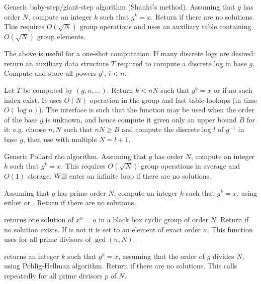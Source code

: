  \break
Generic baby-step/giant-step algorithm (Shanks's method). Assuming
that $g$ has order $N$, compute an integer $k$ such that $g^k = x$.
Return  if there are no solutions. This requires
$O(\sqrt{N})$ group operations and uses an auxiliary table containing
$O(\sqrt{N})$ group elements.

The above is useful for a one-shot computation. If many discrete logs
are desired:
return an auxiliary data structure $T$ required to compute a discrete log in
base $g$. Compute and store all powers $g^i$,  $i < n$.

Let $T$ be computed by $(g,n,\dots)$.
Return $k < n N$ such that  $g^k = x$ or  if no such index exist.
It uses $O(N)$ operation in the group and fast table lookups  (in time
$O(\log n)$). The interface is such that the function may be used when the
order of the base $g$ is unknown, and hence compute it given only an upper
bound $B$ for it: e.g. choose $n,N$ such that $nN \geq B$ and compute the
discrete log $l$ of $g^{-1}$ in base $g$, then use 
with multiple $N = l+1$.

 \break
Generic Pollard rho algorithm. Assuming that $g$ has order $N$, compute an
integer $k$ such that $g^k = x$. This requires $O(\sqrt{N})$ group operations
in average and $O(1)$ storage. Will enter an infinite loop if there are no
solutions.

Assuming that $g$ has prime order $N$, compute an integer $k$ such that
$g^k = x$, using either  or .
Return  if there are no solutions.

  returns one solution of $x^n = a$ in a
black box cyclic group of order $N$. Return  if no solution exists.
If  is not  it is set to an element of exact order $n$.
This function uses  for all prime divisors of $\gcd(n,N)$.

returns an integer $k$ such that $g^k = x$, assuming that the order of $g$
divides $N$, using Pohlig-Hellman algorithm. Return  if
there are no solutions. This calls  repeatedly for all prime
divisors $p$ of $N$.

